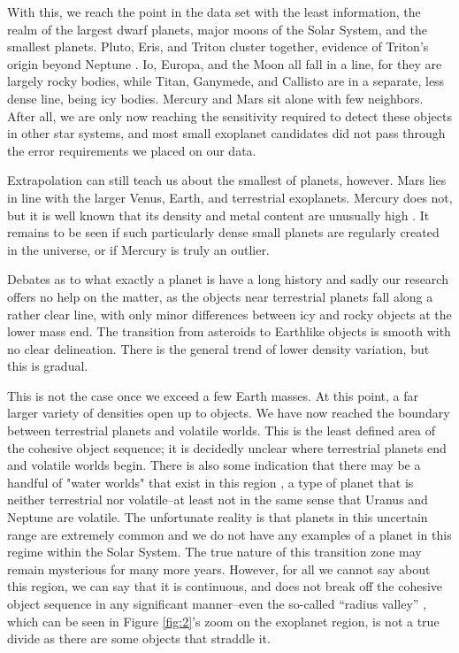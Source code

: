 \documentclass[twocolumn,linenumbers]{aastex631}
\begin{document}
With this, we reach the point in the data set with the least information, the realm of the largest dwarf planets, major moons of the Solar System, and the smallest planets. Pluto, Eris, and Triton cluster together, evidence of Triton's origin beyond Neptune \citep{Agnor2006}. Io, Europa, and the Moon all fall in a line, for they are largely rocky bodies, while Titan, Ganymede, and Callisto are in a separate, less dense line, being icy bodies. Mercury and Mars sit alone with few neighbors. After all, we are only now reaching the sensitivity required to detect these objects in other star systems, and most small exoplanet candidates did not pass through the error requirements we placed on our data. 

Extrapolation can still teach us about the smallest of planets, however. Mars lies in line with the larger Venus, Earth, and terrestrial exoplanets. Mercury does not, but it is well known that its density and metal content are unusually high \citep{Spohn2001}. It remains to be seen if such particularly dense small planets are regularly created in the universe, or if Mercury is truly an outlier. 

Debates as to what exactly a planet is have a long history \citep{Stern2002, Soter2006, Metzger2022} and sadly our research offers no help on the matter, as the objects near terrestrial planets fall along a rather clear line, with only minor differences between icy and rocky objects at the lower mass end. The transition from asteroids to Earthlike objects is smooth with no clear delineation. There is the general trend of lower density variation, but this is gradual. 

This is not the case once we exceed a few Earth masses. At this point, a far larger variety of densities open up to objects. We have now reached the boundary between terrestrial planets and volatile worlds. This is the least defined area of the cohesive object sequence; it is decidedly unclear where terrestrial planets end and volatile worlds begin. There is also some indication that there may be a handful of "water worlds" that exist in this region \citep{Adams2008, Zeng2019}, a type of planet that is neither terrestrial nor volatile--at least not in the same sense that Uranus and Neptune are volatile. The unfortunate reality is that planets in this uncertain range are extremely common and we do not have any examples of a planet in this regime within the Solar System. The true nature of this transition zone may remain mysterious for many more years. However, for all we cannot say about this region, we can say that it is continuous, and does not break off the cohesive object sequence in any significant manner--even the so-called ``radius valley'' \citep{Eylen2018, Armstrong2019}, which can be seen in Figure \ref{fig:2}'s zoom on the exoplanet region, is not a true divide as there are some objects that straddle it. 
\end{document}

